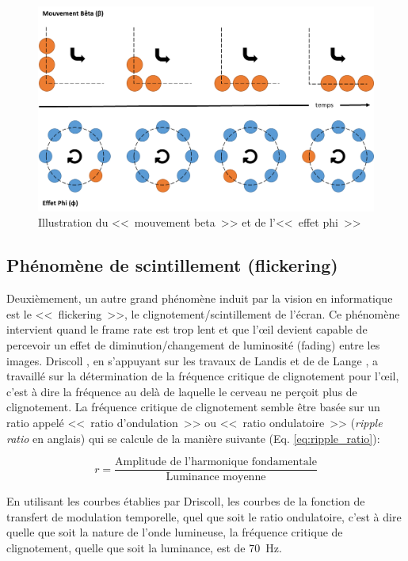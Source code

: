 	\begin{figure}[h]
		\centering
		\includegraphics[scale=.65]{Figures/MouvementBetaEffetPhi}
		\caption{Illustration du <<~mouvement beta~>> et de l'<<~effet phi~>>}
		\label{fig:beta_phi}
	\end{figure}
	
	\subsection{Phénomène de scintillement (flickering)}
	\par Deuxièmement, un autre grand phénomène induit par la vision en informatique est le <<~flickering~>>, le clignotement/scintillement de l'écran. Ce phénomène intervient quand le frame rate est trop lent et que l'œil devient capable de percevoir un effet de diminution/changement de luminosité (fading) entre les images. Driscoll \citep{driscoll_eyes_1978}, en s'appuyant sur les travaux de Landis \citep{landis_determinants_1954} et de de Lange \citep{de_lange_dzn_research_1958,de_lange_dzn_research_1958-1}, a travaillé sur la détermination de la fréquence critique de clignotement pour l'œil, c'est à dire la fréquence au delà de laquelle le cerveau ne perçoit plus de clignotement. La fréquence critique de clignotement semble être basée sur un ratio appelé <<~ratio d'ondulation~>> ou <<~ratio ondulatoire~>> (\textit{ripple ratio} en anglais) qui se calcule de la manière suivante (Eq. \ref{eq:ripple_ratio}):
	
	\begin{equation}
	r = \frac{\textrm{Amplitude de l'harmonique fondamentale}}{\textrm{Luminance moyenne}}
	\label{eq:ripple_ratio}
	\end{equation}
	
	\par En utilisant les courbes établies par Driscoll, les courbes de la fonction de transfert de modulation temporelle, quel que soit le ratio ondulatoire, c'est à dire quelle que soit la nature de l'onde lumineuse, la fréquence critique de clignotement, quelle que soit la luminance, est de 70~Hz.
	
